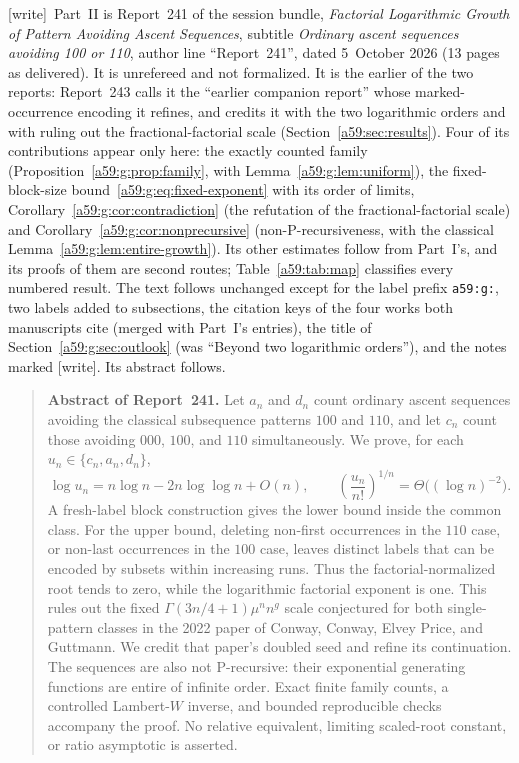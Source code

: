 \documentclass[11pt,letterpaper]{article}
\theoremstyle{remark}\newtheorem{remark}[theorem]{Remark}
\newcommand{\wtag}{\textup{[write]}}
\theoremstyle{remark}\newtheorem{wremark}{Remark}\renewcommand{\thewremark}{W\arabic{wremark}}
\theoremstyle{plain}\newtheorem{wcorollary}[wremark]{Corollary}
\begin{document}
\wtag\ Part~II is Report~241 of the session bundle, \emph{Factorial
Logarithmic Growth of Pattern Avoiding Ascent Sequences}, subtitle
\emph{Ordinary ascent sequences avoiding 100 or 110}, author line
``Report~241'', dated 5~October 2026 (13 pages as delivered). It is
unrefereed and not formalized. It is the earlier of the two reports:
Report~243 calls it the ``earlier companion report'' whose
marked-occurrence encoding it refines, and credits it with the two
logarithmic orders and with ruling out the fractional-factorial scale
(Section~\ref{a59:sec:results}). Four of its contributions appear only
here: the exactly counted family (Proposition~\ref{a59:g:prop:family}, with
Lemma~\ref{a59:g:lem:uniform}), the fixed-block-size
bound~\eqref{a59:g:eq:fixed-exponent} with its order of limits,
Corollary~\ref{a59:g:cor:contradiction} (the refutation of the
fractional-factorial scale) and Corollary~\ref{a59:g:cor:nonprecursive}
(non-P-recursiveness, with the classical
Lemma~\ref{a59:g:lem:entire-growth}). Its other estimates follow from
Part~I's, and its proofs of them are second routes;
Table~\ref{a59:tab:map} classifies every numbered result. The text follows unchanged
except for the label prefix \texttt{a59:g:}, two labels added to
subsections, the citation keys of the four works both manuscripts cite
(merged with Part~I's entries), the title of
Section~\ref{a59:g:sec:outlook} (was ``Beyond two logarithmic orders''),
and the notes marked \wtag. Its abstract follows.

\begin{quote}\small
\textbf{Abstract of Report~241.}
Let $a_n$ and $d_n$ count ordinary ascent sequences avoiding the classical subsequence patterns $100$ and $110$, and let $c_n$ count those avoiding $000$, $100$, and $110$ simultaneously. We prove, for each $u_n\in\{c_n,a_n,d_n\}$,
\[
 \log u_n=n\log n-2n\log\log n+O(n),\qquad
 \left(\frac{u_n}{n!}\right)^{1/n}=\Theta\bigl((\log n)^{-2}\bigr).
\]
A fresh-label block construction gives the lower bound inside the common class. For the upper bound, deleting non-first occurrences in the $110$ case, or non-last occurrences in the $100$ case, leaves distinct labels that can be encoded by subsets within increasing runs. Thus the factorial-normalized root tends to zero, while the logarithmic factorial exponent is one. This rules out the fixed $\Gamma(3n/4+1)\mu^n n^g$ scale conjectured for both single-pattern classes in the 2022 paper of Conway, Conway, Elvey Price, and Guttmann. We credit that paper's doubled seed and refine its continuation. The sequences are also not P-recursive: their exponential generating functions are entire of infinite order. Exact finite family counts, a controlled Lambert-$W$ inverse, and bounded reproducible checks accompany the proof. No relative equivalent, limiting scaled-root constant, or ratio asymptotic is asserted.
\end{quote}
\end{document}
